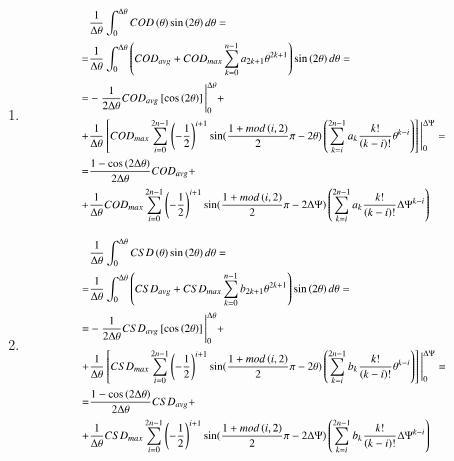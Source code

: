 \documentclass[review]{elsarticle}
\begin{document}
\begin{enumerate}
\item
\begin{equation}
\footnotesize
\begin{aligned}
&\frac{1}{\Delta\theta}\int_{0}^{\Delta\theta}COD\left(\theta\right)\sin\left(2\theta\right)d\theta=\\
=&\frac{1}{\Delta\theta}\int_{0}^{\Delta\theta}\left(COD_{avg}+COD_{max}\sum_{k=0}^{n-1}a_{2k+1}\theta^{2k+1}\right)\sin\left(2\theta\right)d\theta=\\
=&-\frac{1}{2\Delta\theta}COD_{avg}\left[\cos\left(2\theta\right)\right]\Bigg\rvert_{0}^{\Delta\theta}+\\
+&\frac{1}{\Delta\theta}\left[COD_{max}\sum_{i=0}^{2n-1}\left(-\frac{1}{2}\right)^{i+1}\sin(\frac{1+mod\left(i,2\right)}{2}\pi-2\theta)\left(\sum_{k=i}^{2n-1}a_{k}\frac{k!}{\left(k-i\right)!}\theta^{k-i}\right)\right]\Bigg\rvert_{0}^{\Delta\Psi}=\\
=&\frac{1-\cos\left(2\Delta\theta\right)}{2\Delta\theta}COD_{avg}+\\
+&\frac{1}{\Delta\theta}COD_{max}\sum_{i=0}^{2n-1}\left(-\frac{1}{2}\right)^{i+1}\sin(\frac{1+mod\left(i,2\right)}{2}\pi-2\Delta\Psi)\left(\sum_{k=i}^{2n-1}a_{k}\frac{k!}{\left(k-i\right)!}\Delta\Psi^{k-i}\right)
\end{aligned}
\end{equation}

\item
\begin{equation}
\footnotesize
\begin{aligned}
&\frac{1}{\Delta\theta}\int_{0}^{\Delta\theta}CSD\left(\theta\right)\sin\left(2\theta\right)d\theta=\\
=&\frac{1}{\Delta\theta}\int_{0}^{\Delta\theta}\left(CSD_{avg}+CSD_{max}\sum_{k=0}^{n-1}b_{2k+1}\theta^{2k+1}\right)\sin\left(2\theta\right)d\theta=\\
=&-\frac{1}{2\Delta\theta}CSD_{avg}\left[\cos\left(2\theta\right)\right]\Bigg\rvert_{0}^{\Delta\theta}+\\
+&\frac{1}{\Delta\theta}\left[CSD_{max}\sum_{i=0}^{2n-1}\left(-\frac{1}{2}\right)^{i+1}\sin(\frac{1+mod\left(i,2\right)}{2}\pi-2\theta)\left(\sum_{k=i}^{2n-1}b_{k}\frac{k!}{\left(k-i\right)!}\theta^{k-i}\right)\right]\Bigg\rvert_{0}^{\Delta\Psi}=\\
=&\frac{1-\cos\left(2\Delta\theta\right)}{2\Delta\theta}CSD_{avg}+\\
+&\frac{1}{\Delta\theta}CSD_{max}\sum_{i=0}^{2n-1}\left(-\frac{1}{2}\right)^{i+1}\sin(\frac{1+mod\left(i,2\right)}{2}\pi-2\Delta\Psi)\left(\sum_{k=i}^{2n-1}b_{k}\frac{k!}{\left(k-i\right)!}\Delta\Psi^{k-i}\right)
\end{aligned}
\end{equation}


\end{enumerate}
\end{document}
